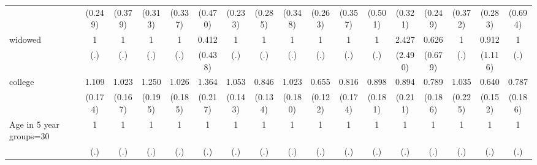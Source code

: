 {\begin{tabular}{l*{16}{c}}
                    &     (0.249)         &     (0.379)         &     (0.313)         &     (0.337)         &     (0.470)         &     (0.233)         &     (0.285)         &     (0.348)         &     (0.263)         &     (0.357)         &     (0.501)         &     (0.321)         &     (0.249)         &     (0.372)         &     (0.283)         &     (0.694)         \\
[1em]
widowed             &           1         &           1         &           1         &           1         &       0.412         &           1         &           1         &           1         &           1         &           1         &           1         &       2.427         &       0.626         &           1         &       0.912         &           1         \\
                    &         (.)         &         (.)         &         (.)         &         (.)         &     (0.438)         &         (.)         &         (.)         &         (.)         &         (.)         &         (.)         &         (.)         &     (2.490)         &     (0.679)         &         (.)         &     (1.116)         &         (.)         \\
[1em]
college             &       1.109         &       1.023         &       1.250         &       1.026         &       1.364         &       1.053         &       0.846         &       1.023         &       0.655\sym{*}  &       0.816         &       0.898         &       0.894         &       0.789         &       1.035         &       0.640         &       0.787         \\
                    &     (0.174)         &     (0.167)         &     (0.195)         &     (0.185)         &     (0.217)         &     (0.143)         &     (0.134)         &     (0.180)         &     (0.122)         &     (0.174)         &     (0.181)         &     (0.211)         &     (0.186)         &     (0.225)         &     (0.152)         &     (0.186)         \\
[1em]
Age in 5 year groups=30&           1         &           1         &           1         &           1         &           1         &           1         &           1         &           1         &           1         &           1         &           1         &           1         &           1         &           1         &           1         &           1         \\
                    &         (.)         &         (.)         &         (.)         &         (.)         &         (.)         &         (.)         &         (.)         &         (.)         &         (.)         &         (.)         &         (.)         &         (.)         &         (.)         &         (.)         &         (.)         &         (.)         \\

\end{tabular}}
